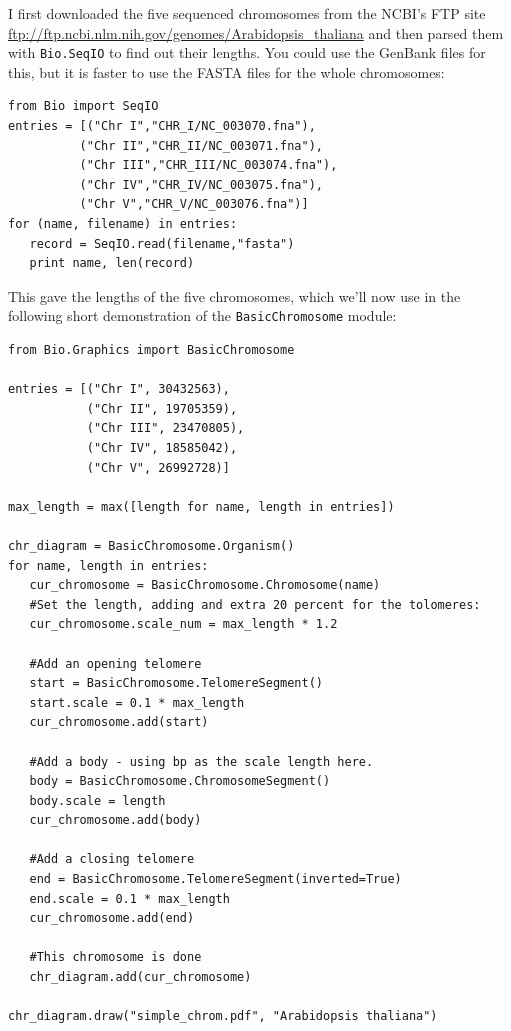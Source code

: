 \documentclass{report}
\begin{document}
I first downloaded the five sequenced chromosomes from the NCBI's FTP site
\url{ftp://ftp.ncbi.nlm.nih.gov/genomes/Arabidopsis_thaliana} and then parsed
them with \verb|Bio.SeqIO| to find out their lengths.  You could use the
GenBank files for this, but it is faster to use the FASTA files for the
whole chromosomes:

\begin{verbatim}
from Bio import SeqIO
entries = [("Chr I","CHR_I/NC_003070.fna"),
          ("Chr II","CHR_II/NC_003071.fna"),
          ("Chr III","CHR_III/NC_003074.fna"),
          ("Chr IV","CHR_IV/NC_003075.fna"),
          ("Chr V","CHR_V/NC_003076.fna")]
for (name, filename) in entries:
   record = SeqIO.read(filename,"fasta")
   print name, len(record)
\end{verbatim}

\noindent This gave the lengths of the five chromosomes, which we'll now use in
the following short demonstration of the \verb|BasicChromosome| module:

\begin{verbatim}
from Bio.Graphics import BasicChromosome

entries = [("Chr I", 30432563),
           ("Chr II", 19705359),
           ("Chr III", 23470805),
           ("Chr IV", 18585042),
           ("Chr V", 26992728)]

max_length = max([length for name, length in entries])
          
chr_diagram = BasicChromosome.Organism()
for name, length in entries:
   cur_chromosome = BasicChromosome.Chromosome(name)
   #Set the length, adding and extra 20 percent for the tolomeres:
   cur_chromosome.scale_num = max_length * 1.2
   
   #Add an opening telomere
   start = BasicChromosome.TelomereSegment()
   start.scale = 0.1 * max_length
   cur_chromosome.add(start)

   #Add a body - using bp as the scale length here.
   body = BasicChromosome.ChromosomeSegment()
   body.scale = length
   cur_chromosome.add(body)

   #Add a closing telomere
   end = BasicChromosome.TelomereSegment(inverted=True)
   end.scale = 0.1 * max_length
   cur_chromosome.add(end)

   #This chromosome is done
   chr_diagram.add(cur_chromosome)

chr_diagram.draw("simple_chrom.pdf", "Arabidopsis thaliana")
\end{verbatim}
\end{document}
